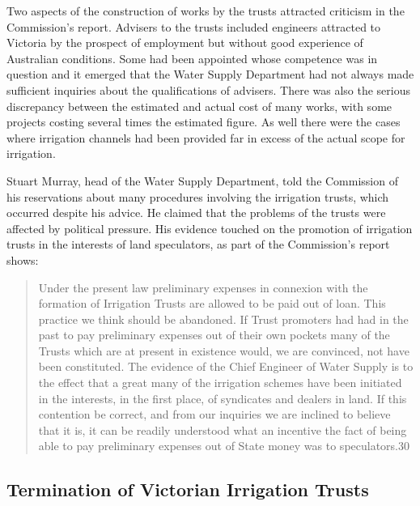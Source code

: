 Two aspects of the construction of works by the trusts attracted
criticism in the Commission's report. Advisers to the trusts included
engineers attracted to Victoria by the prospect of employment but
without good experience of Australian conditions. Some had been
appointed whose competence was in question and it emerged that the
Water Supply Department had not always made sufficient inquiries about
the qualifications of advisers. There was also the serious discrepancy
between the estimated and actual cost of many works, with some
projects costing several times the estimated figure. As well there
were the cases where irrigation channels had been provided far in
excess of the actual scope for irrigation.

Stuart Murray, head of the Water Supply Department, told the
Commission of his reservations about many procedures involving the
irrigation trusts, which occurred despite his advice. He claimed that
the problems of the trusts were affected by political pressure. His
evidence touched on the promotion of irrigation trusts in the
interests of land speculators, as part of the Commission's report
shows:
\begin{quote}
	Under the present law preliminary expenses in connexion with
	the formation of Irrigation Trusts are allowed to be paid out
	of loan.  This practice we think should be abandoned. If Trust
	promoters had had in the past to pay preliminary expenses out
	of their own pockets many of the Trusts which are at present
	in existence would, we are convinced, not have been
	constituted. The evidence of the Chief Engineer of Water
	Supply is to the effect that a great many of the irrigation
	schemes have been initiated in the interests, in the first
	place, of syndicates and dealers in land. If this contention
	be correct, and from our inquiries we are inclined to believe
	that it is, it can be readily understood what an incentive the
	fact of being able to pay preliminary expenses out of State
	money was to speculators.30
\end{quote}

\subsection{Termination of Victorian Irrigation Trusts}

